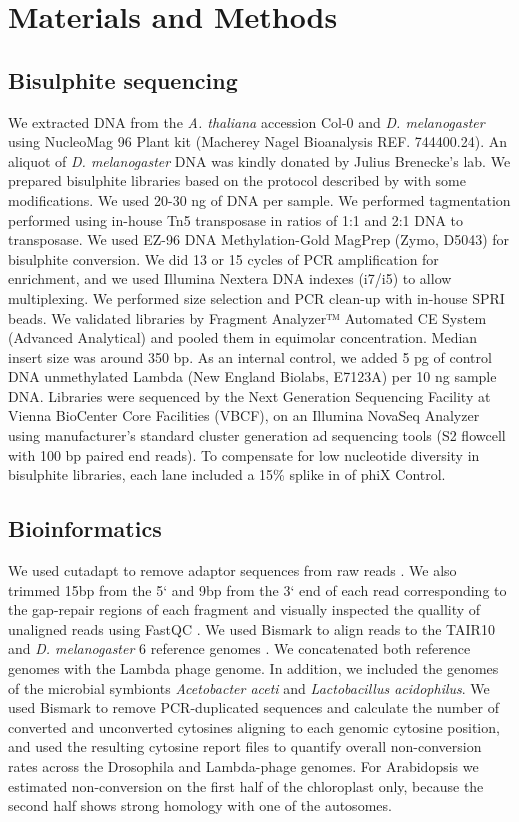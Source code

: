 \documentclass[twocolumn,twoside,lettersize]{article}
\begin{document}
\section{Materials and Methods}

\subsection{Bisulphite sequencing}

We extracted DNA from the \textit{A. thaliana} accession Col-0 and \textit{D. melanogaster} using NucleoMag 96 Plant kit (Macherey Nagel Bioanalysis REF. 744400.24).
An aliquot of \textit{D. melanogaster} DNA was kindly donated by Julius Brenecke’s lab.
We prepared bisulphite libraries based on the protocol described by \textcite{weichenhan2019generation} with some modifications.
We used 20-30 ng of DNA per sample.
We performed tagmentation performed using in-house Tn5 transposase in ratios of 1:1 and 2:1 DNA to transposase.
We used EZ-96 DNA Methylation-Gold MagPrep (Zymo, D5043) for bisulphite conversion.
We did 13 or 15 cycles of PCR amplification for enrichment, and we used Illumina Nextera DNA indexes (i7/i5) to allow multiplexing.
We performed size selection and PCR clean-up with in-house SPRI beads.
We validated libraries by Fragment Analyzer™ Automated CE System (Advanced Analytical) and pooled them in equimolar concentration.
Median insert size was around 350 bp.
As an internal control, we added 5 pg of control DNA unmethylated Lambda (New England Biolabs, E7123A) per 10 ng sample DNA. 
Libraries were sequenced by the Next Generation Sequencing Facility at Vienna BioCenter Core Facilities (VBCF), on an Illumina NovaSeq Analyzer using manufacturer’s standard cluster generation ad sequencing tools (S2 flowcell with 100 bp paired end reads).
To compensate for low nucleotide diversity in bisulphite libraries, each lane included a 15\% splike in of phiX Control.

\subsection{Bioinformatics}

We used cutadapt to remove adaptor sequences from raw reads \parencite{martin2011cutadapt}.
We also trimmed 15bp from the 5` and 9bp from the 3` end of each read corresponding to the gap-repair regions of each fragment and visually inspected the quallity of unaligned reads using FastQC \parencite{andrews2020fastqc}.
We used Bismark to align reads to the TAIR10 and \textit{D. melanogaster} 6 reference genomes \parencite{krueger2011bismark}.
We concatenated both reference genomes with the Lambda phage genome.
In addition, we included the genomes of the microbial symbionts \textit{Acetobacter aceti} and \textit{Lactobacillus acidophilus}.
We used Bismark to remove PCR-duplicated sequences and calculate the number of converted and unconverted cytosines aligning to each genomic cytosine position, and used the resulting cytosine report files to quantify overall non-conversion rates across the Drosophila and Lambda-phage genomes.
For Arabidopsis we estimated non-conversion on the first half of the chloroplast only, because the second half shows strong homology with one of the autosomes.
\end{document}
